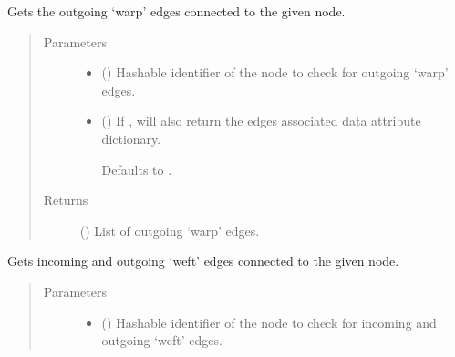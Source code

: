 \documentclass[letterpaper,10pt,english]{sphinxmanual}
\begin{document}
\begin{fulllineitems}
\begin{fulllineitems}
\label{\detokenize{cockatoo:cockatoo.KnitDiNetwork.node_warp_edges_out}}
Gets the outgoing ‘warp’ edges connected to the given node.
\begin{quote}\begin{description}
\item[{Parameters}] \leavevmode\begin{itemize}
\item {} 
 () \textendash{} Hashable identifier of the node to check for outgoing ‘warp’ edges.

\item {} 
 (\sphinxstyleliteralemphasis{\sphinxupquote{, }}) \textendash{} 
If , will also return the edges associated data attribute
dictionary.

Defaults to .


\end{itemize}

\item[{Returns}] \leavevmode
{} () \textendash{} List of outgoing ‘warp’ edges.

\end{description}\end{quote}

\end{fulllineitems}


\begin{fulllineitems}
\label{\detokenize{cockatoo:cockatoo.KnitDiNetwork.node_weft_edges}}
Gets incoming and outgoing ‘weft’ edges connected to the given node.
\begin{quote}\begin{description}
\item[{Parameters}] \leavevmode\begin{itemize}
\item {} 
 () \textendash{} Hashable identifier of the node to check for incoming and outgoing
‘weft’ edges.


\end{itemize}
\end{description}
\end{quote}
\end{fulllineitems}
\end{fulllineitems}
\end{document}
